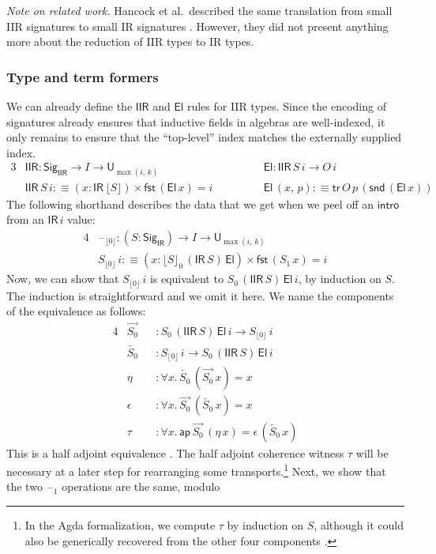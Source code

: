 \documentclass[acmsmall,screen,review,anonymous]{acmart}
\newcommand{\msf}[1]{{\mathsf{#1}}}
\newcommand{\U}{\msf{U}}
\newcommand{\El}{\msf{El}}
\newcommand{\Sig}{\msf{Sig}}
\newcommand{\blank}{{\mathord{\hspace{1pt}\text{--}\hspace{1pt}}}}
\newcommand{\IR}{\msf{IR}}
\newcommand{\intro}{\msf{intro}}
\newcommand{\tr}{\msf{tr}}
\newcommand{\fst}{\msf{fst}}
\newcommand{\snd}{\msf{snd}}
\newcommand{\IIR}{\msf{IIR}}
\newcommand{\Sigr}[1]{\lfloor #1 \rfloor}
\newcommand{\floord}[1]{\lfloor #1 \rfloor}
\newcommand{\ora}[1]{\overrightarrow{#1}}
\newcommand{\ola}[1]{\overleftarrow{#1}}
\newcommand{\ap}{\msf{ap}}
\begin{document}
\emph{Note on related work.} Hancock et al.\ described the same translation from small IIR
signatures to small IR signatures \cite{TODO}. However, they did not present anything more about the
reduction of IIR types to IR types.

\subsubsection{Type and term formers} We can already define the $\IIR$ and $\El$ rules for IIR types. Since the encoding of signatures
already ensures that inductive fields in algebras are well-indexed, it only remains to ensure that
the ``top-level'' index matches the externally supplied index.
\begin{alignat*}{3}
  &\IIR : \Sig_\IIR \to I \to \U_{\max(i,\,k)}                         && \El : \IIR\,S\,i \to O\,i \\
  &\IIR\,S\,i :\equiv (x : \IR\,\Sigr{S}) \times \fst\,(\El\,x) = i \hspace{3em}&& \El\,(x,\,p) :\equiv \tr\,O\,p\,(\snd\,(\El\,x))
\end{alignat*}
The following shorthand describes the data that we get when we peel off an $\intro$ from an $\IR\,i$ value:
\begin{alignat*}{4}
  &\blank_{\floord{0}} : (S : \Sig_\IR) \to I \to \U_{\max(i,\,k)}\\
  &S_{\floord{0}}\,i :\equiv (x : \floord{S}_0\,(\IR\,S)\,\El) \times \fst\,(S_1\,x) = i
\end{alignat*}
Now, we can show that $S_{\floord{0}}\,i$ is equivalent to $S_0\,(\IIR\,S)\,\El\,i$, by induction on
$S$. The induction is straightforward and we omit it here. We name the components of the equivalence
as follows:
\begin{alignat*}{4}
  &\ora{S_0} &&: S_0\,(\IIR\,S)\,\El\,i \to S_{\floord{0}}\,i \\
  &\ola{S_0} &&: S_{\floord{0}}\,i \to S_0\,(\IIR\,S)\,\El\,i \\
  &\eta      &&: \forall x.\, \ola{S_0}\,(\ora{S_0}\,x) = x \\
  &\epsilon  &&: \forall x.\, \ora{S_0}\,(\ola{S_0}\,x) = x \\
  &\tau      &&: \forall x.\, \ap\,\ora{S_0}\,(\eta\,x) = \epsilon\,(\ola{S_0}\,x)
\end{alignat*}
This is a half adjoint equivalence \cite{TODO}. The half adjoint coherence witness $\tau$ will be
necessary at a later step for rearranging some transports.\footnote{In the Agda formalization, we
compute $\tau$ by induction on $S$, although it could also be generically recovered from the other
four components \cite{TODO}.} Next, we show that the two $\blank_1$ operations are the same, modulo
\end{document}

